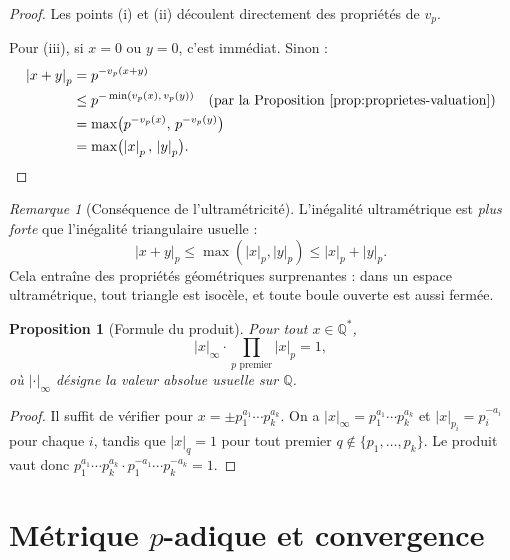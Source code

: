 \documentclass[12pt,a4paper,openany]{book}
\theoremstyle{definition}
\theoremstyle{plain}
\newtheorem{proposition}[definition]{Proposition}
\theoremstyle{remark}
\newtheorem{remarque}[definition]{Remarque}
\newcommand{\Q}{\mathbb{Q}}
\newcommand{\abs}[1]{\left|#1\right|}
\begin{document}
\begin{proof}
Les points (i) et (ii) découlent directement des propriétés de $v_p$.

Pour (iii), si $x = 0$ ou $y = 0$, c'est immédiat. Sinon :
\begin{align*}
  \abs{x + y}_p &= p^{-v_p(x+y)} \\
  &\leq p^{-\min(v_p(x),\, v_p(y))} \quad \text{(par la Proposition~\ref{prop:proprietes-valuation})} \\
  &= \max\bigl(p^{-v_p(x)},\, p^{-v_p(y)}\bigr) \\
  &= \max\bigl(\abs{x}_p,\, \abs{y}_p\bigr). \qedhere
\end{align*}
\end{proof}

\begin{remarque}[Conséquence de l'ultramétricité]
\label{rem:ultrametrique-consequences}
L'inégalité ultramétrique est \emph{plus forte} que l'inégalité triangulaire usuelle :
\[
  \abs{x+y}_p \leq \max(\abs{x}_p, \abs{y}_p) \leq \abs{x}_p + \abs{y}_p.
\]
Cela entraîne des propriétés géométriques surprenantes : dans un espace
ultramétrique, tout triangle est isocèle, et toute boule ouverte est aussi fermée.
\end{remarque}

\begin{proposition}[Formule du produit]
\label{prop:formule-produit}
Pour tout $x \in \Q^*$,
\[
  \abs{x}_\infty \cdot \prod_{p \text{ premier}} \abs{x}_p = 1,
\]
où $\abs{\cdot}_\infty$ désigne la valeur absolue usuelle sur $\Q$.
\end{proposition}

\begin{proof}
Il suffit de vérifier pour $x = \pm p_1^{a_1} \cdots p_k^{a_k}$. On a
$\abs{x}_\infty = p_1^{a_1} \cdots p_k^{a_k}$ et $\abs{x}_{p_i} = p_i^{-a_i}$
pour chaque $i$, tandis que $\abs{x}_q = 1$ pour tout premier $q \notin \{p_1, \ldots, p_k\}$.
Le produit vaut donc $p_1^{a_1} \cdots p_k^{a_k} \cdot p_1^{-a_1} \cdots p_k^{-a_k} = 1$.
\end{proof}


\section{Métrique \texorpdfstring{$p$}{p}-adique et convergence}
\label{sec:metrique-p-adique}
\end{document}
